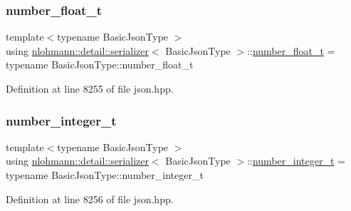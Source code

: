 \subsubsection{\texorpdfstring{number\+\_\+float\+\_\+t}{number\_float\_t}}
{\footnotesize\ttfamily template$<$typename Basic\+Json\+Type $>$ \\
using \hyperlink{classnlohmann_1_1detail_1_1serializer}{nlohmann\+::detail\+::serializer}$<$ Basic\+Json\+Type $>$\+::\hyperlink{classnlohmann_1_1detail_1_1serializer_a460c6794fbabbb2ae83380e987a6c030}{number\+\_\+float\+\_\+t} =  typename Basic\+Json\+Type\+::number\+\_\+float\+\_\+t\hspace{0.3cm}{\ttfamily [private]}}



Definition at line 8255 of file json.\+hpp.

\mbox{\label{classnlohmann_1_1detail_1_1serializer_ae7b1df1c70bdec1371f297567726a198}} 
\subsubsection{\texorpdfstring{number\+\_\+integer\+\_\+t}{number\_integer\_t}}
{\footnotesize\ttfamily template$<$typename Basic\+Json\+Type $>$ \\
using \hyperlink{classnlohmann_1_1detail_1_1serializer}{nlohmann\+::detail\+::serializer}$<$ Basic\+Json\+Type $>$\+::\hyperlink{classnlohmann_1_1detail_1_1serializer_ae7b1df1c70bdec1371f297567726a198}{number\+\_\+integer\+\_\+t} =  typename Basic\+Json\+Type\+::number\+\_\+integer\+\_\+t\hspace{0.3cm}{\ttfamily [private]}}



Definition at line 8256 of file json.\+hpp.

\mbox{\label{classnlohmann_1_1detail_1_1serializer_a16c7b7a726a38ff0c06dce7ba7968391}} 
